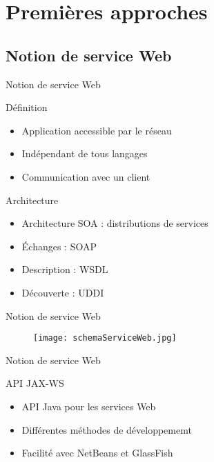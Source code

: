 \section{Premi\`eres approches}

\subsection{Notion de service Web}

\begin{frame}{Notion de service Web}
	\begin{block}{D\'efinition}
		\begin{itemize}
			\item Application accessible par le r\'eseau
			\item Ind\'ependant de tous langages
			\item Communication avec un client
			
		\end{itemize}
		
	\end{block}
	
	\begin{block}{Architecture}
		\begin{itemize}
			\item Architecture SOA : distributions de services
			\item \'Echanges : SOAP
			\item Description : WSDL
			\item D\'ecouverte : UDDI

		\end{itemize}
		
	\end{block}
	
\end{frame}


\begin{frame}{Notion de service Web}
	\begin{figure}[h]
		\centering
		\texttt{[image: schemaServiceWeb.jpg]}
		
	\end{figure}
		
\end{frame}


\begin{frame}{Notion de service Web}
	\begin{block}{API JAX-WS}
		\begin{itemize}
			\item API Java pour les services Web
			\item Diff\'erentes m\'ethodes de d\'eveloppememt
			\item Facilit\'e avec NetBeans et GlassFish
		
		\end{itemize}

	\end{block}

\end{frame}

